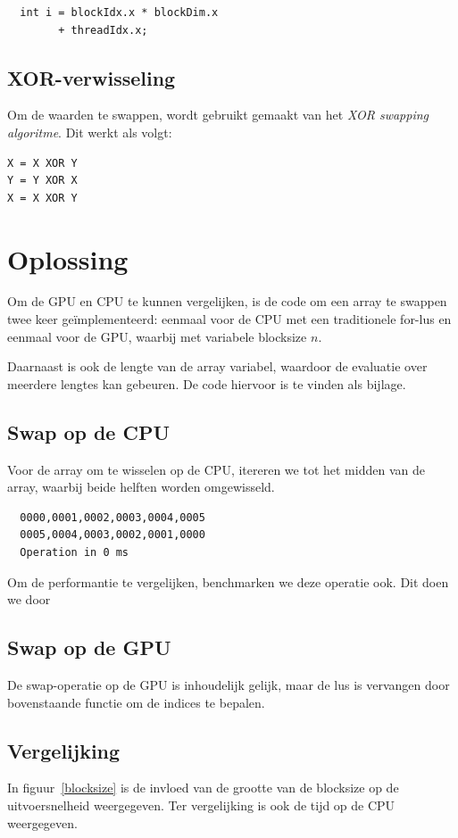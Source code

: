 \documentclass[10pt, twocolumn, a4paper]{article}
\begin{document}
\begin{verbatim}
  int i = blockIdx.x * blockDim.x 
		+ threadIdx.x;
\end{verbatim}

\subsection{XOR-verwisseling}
Om de waarden te swappen, wordt gebruikt gemaakt van het \emph{XOR swapping algoritme}. Dit werkt als volgt:

\begin{verbatim}
X = X XOR Y
Y = Y XOR X
X = X XOR Y
\end{verbatim}

\section{Oplossing}
Om de GPU en CPU te kunnen vergelijken, is de code om een array te swappen twee keer ge\"implementeerd: eenmaal voor de CPU met een traditionele for-lus en eenmaal voor de GPU, waarbij met variabele blocksize $n$.

Daarnaast is ook de lengte van de array variabel, waardoor de evaluatie over meerdere lengtes kan gebeuren. De code hiervoor is te vinden als bijlage.

\subsection{Swap op de CPU}
Voor de array om te wisselen op de CPU, itereren we tot het midden van de array, waarbij beide helften worden omgewisseld.

\begin{verbatim}
  0000,0001,0002,0003,0004,0005
  0005,0004,0003,0002,0001,0000 
  Operation in 0 ms
\end{verbatim}

Om de performantie te vergelijken, benchmarken we deze operatie ook. Dit doen we door 

\subsection{Swap op de GPU}
De swap-operatie op de GPU is inhoudelijk gelijk, maar de lus is vervangen door bovenstaande functie om de indices te bepalen. 

\subsection{Vergelijking}
In figuur~\ref{blocksize} is de invloed van de grootte van de blocksize op de uitvoersnelheid weergegeven. Ter vergelijking is ook de tijd op de CPU weergegeven.
\end{document}
